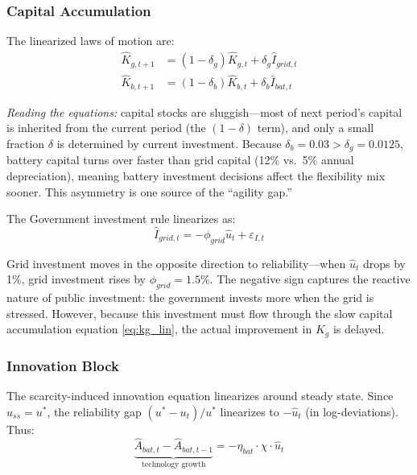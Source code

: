 \documentclass[12pt, a4paper]{article}
\begin{document}
\subsubsection{Capital Accumulation}

The linearized laws of motion are:
\begin{align}
\hat{K}_{g,t+1} &= (1-\delta_g)\hat{K}_{g,t} + \delta_g \hat{I}_{grid,t} \label{eq:kg_lin} \\
\hat{K}_{b,t+1} &= (1-\delta_b)\hat{K}_{b,t} + \delta_b \hat{I}_{bat,t} \label{eq:kb_lin}
\end{align}

\noindent \textit{Reading the equations:} capital stocks are sluggish---most of next period's capital is inherited from the current period (the $(1-\delta)$ term), and only a small fraction $\delta$ is determined by current investment. Because $\delta_b = 0.03 > \delta_g = 0.0125$, battery capital turns over faster than grid capital (12\% vs.\ 5\% annual depreciation), meaning battery investment decisions affect the flexibility mix sooner. This asymmetry is one source of the ``agility gap.''

The Government investment rule linearizes as:
\begin{equation}
\hat{I}_{grid,t} = -\phi_{grid} \hat{u}_t + \varepsilon_{I,t}
\label{eq:gridrule_lin}
\end{equation}

Grid investment moves in the opposite direction to reliability---when $\hat{u}_t$ drops by 1\%, grid investment rises by $\phi_{grid} = 1.5$\%. The negative sign captures the reactive nature of public investment: the government invests more when the grid is stressed. However, because this investment must flow through the slow capital accumulation equation \eqref{eq:kg_lin}, the actual improvement in $K_g$ is delayed.

\subsubsection{Innovation Block}

The scarcity-induced innovation equation linearizes around steady state. Since $u_{ss} = u^*$, the reliability gap $(u^* - u_t)/u^*$ linearizes to $-\hat{u}_t$ (in log-deviations). Thus:
\begin{equation}
\underbrace{\hat{A}_{bat,t} - \hat{A}_{bat,t-1}}_{\text{technology growth}} = -\eta_{bat} \cdot \chi \cdot \hat{u}_t
\label{eq:abat_lin}
\end{equation}
\end{document}

